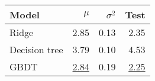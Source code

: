\begin{tabular}{lrrr}
  \toprule
  Model         & $\mu$            & $\sigma^2$ & Test
  \\
  \midrule
  Ridge         & 2.85             & 0.13       & 2.35
  \\
  Decision tree & 3.79             & 0.10       & 4.53
  \\
  GBDT          & \underline{2.84} & 0.19       & \underline{2.25}
  \\
  \bottomrule
\end{tabular}
